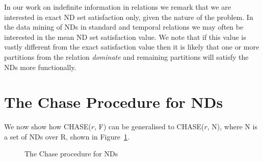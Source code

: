 In our work on indefinite information in relations we remark that we
are interested in exact ND set satisfaction only, given the nature of
the problem. In the data mining of NDs in standard and temporal
relations we may often be interested in the mean ND set satisfaction
value. We note that if this value is vastly different from the exact
satisfaction value then it is likely that one or more partitions from
the relation {\em dominate} and remaining partitions will satisfy the
NDs more functionally.

\section{The Chase Procedure for NDs}\label{sec:nd_chase}

We now show how CHASE($r$, F) can be generalised to CHASE($r$, N), where N is
a set of NDs over R, shown in Figure~\ref{numdep:fig:nd_chase}.

{\renewcommand{\baselinestretch}{1}
\begin{figure}[ht]
\begin{center}
\end{center}
\caption{\label{numdep:fig:nd_chase} The Chase procedure for NDs}
\end{figure}
}

